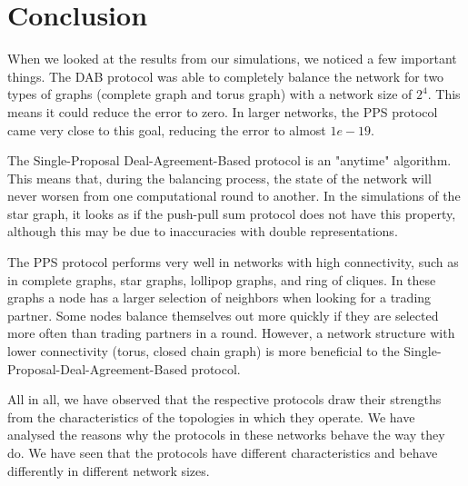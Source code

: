 \chapter{Conclusion}\label{chap:conclusion}
When we looked at the results from our simulations, we noticed a few important things. The DAB protocol was able to completely balance the network for two types of graphs (complete graph and torus graph) with a network size of $2^{4}$. This means it could reduce the error to zero. In larger networks, the PPS protocol came very close to this goal, reducing the error to almost $1e-19$.  

The Single-Proposal Deal-Agreement-Based protocol is an "anytime" algorithm. This means that, during the balancing process, the state of the network will never worsen from one computational round to another. In the simulations of the star graph, it looks as if the push-pull sum protocol does not have this property, although this may be due to inaccuracies with double representations.

The PPS protocol performs very well in networks with high connectivity, such as in complete graphs, star graphs, lollipop graphs, and ring of cliques. In these graphs a node has a larger selection of neighbors when looking for a trading partner. Some nodes balance themselves out more quickly if they are selected more often than trading partners in a round. However, a network structure with lower connectivity (torus, closed chain graph) is more beneficial to the Single-Proposal-Deal-Agreement-Based protocol.

All in all, we have observed that the respective protocols draw their strengths from the characteristics of the topologies in which they operate. We have analysed the reasons why the protocols in these networks behave the way they do. We have seen that the protocols have different characteristics and behave differently in different network sizes.